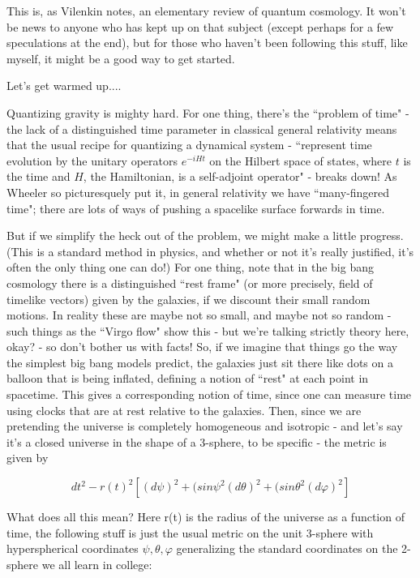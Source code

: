 

This is, as Vilenkin notes, an elementary review of quantum cosmology. It won't be news to anyone who has kept up on that subject (except perhaps for a few speculations at the end), but for those who haven't been following this stuff, like myself, it might be a good way to get started.

Let's get warmed up....

Quantizing gravity is mighty hard. For one thing, there's the ``problem of time" - the lack of a distinguished time parameter in classical general relativity means that the usual recipe for quantizing a dynamical system - ``represent time evolution by the unitary operators $e^{-iHt}$ on the Hilbert space of states, where $t$ is the time and $H$, the Hamiltonian, is a self-adjoint operator" - breaks down! As Wheeler so picturesquely put it, in general relativity we have ``many-fingered time"; there are lots of ways of pushing a spacelike surface forwards in time.

But if we simplify the heck out of the problem, we might make a little progress. (This is a standard method in physics, and whether or not it's really justified, it's often the only thing one can do!) For one thing, note that in the big bang cosmology there is a distinguished ``rest frame" (or more precisely, field of timelike vectors) given by the galaxies, if we discount their small random motions. In reality these are maybe not so small, and maybe not so random - such things as the ``Virgo flow" show this - but we're talking strictly theory here, okay? - so don't bother us with facts! So, if we imagine that things go the way the simplest big bang models predict, the galaxies just sit there like dots on a balloon that is being inflated, defining a notion of ``rest" at each point in spacetime. This gives a corresponding notion of time, since one can measure time using clocks that are at rest relative to the galaxies. Then, since we are pretending the universe is completely homogeneous and isotropic - and let's say it's a closed universe in the shape of a 3-sphere, to be specific - the metric is given by

\[dt^2 - r(t)^2[(d\psi)^2 + (sin\psi^2{(d\theta)^2 + (sin\theta^2 (d\varphi)^2}]\]

What does all this mean? Here r(t) is the radius of the universe as a function of time, the following stuff is just the usual metric on the unit 3-sphere with hyperspherical coordinates $\psi, \theta, \varphi$ generalizing the standard coordinates on the 2-sphere we all learn in college:

